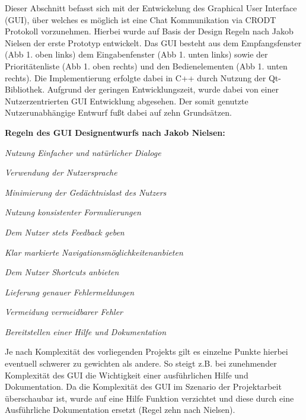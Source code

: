 \label{cap:chatGui}

Dieser Abschnitt befasst sich mit der Entwickelung des Graphical User Interface
(GUI), {\"u}ber welches es m{\"o}glich ist eine Chat Kommunikation via CRODT
Protokoll vorzunehmen. Hierbei wurde auf Basis der Design Regeln nach
Jakob Nielsen der erste Prototyp entwickelt. Das GUI besteht
aus dem Empfangsfenster (Abb 1. oben links) dem Eingabenfenster (Abb 1.
unten links) sowie der Priorit{\"a}tenliste (Abb 1. oben rechts) und den
Bedienelementen (Abb 1. unten rechts). Die Implementierung erfolgte dabei in
C++ durch Nutzung der Qt-Bibliothek. Aufgrund der geringen Entwicklungszeit,
wurde dabei von einer Nutzerzentrierten GUI Entwicklung
abgesehen. Der somit genutzte Nutzerunabh{\"a}ngige Entwurf fu{\ss}t dabei auf
zehn Grunds{\"a}tzen.

\textbf{Regeln des GUI Designentwurfs nach Jakob Nielsen:}

   \begin{compactenum}[I]
     \item \textit{Nutzung Einfacher und nat{\"u}rlicher Dialoge}
     \item \textit{Verwendung der Nutzersprache}
     \item \textit{Minimierung der Ged{\"a}chtnislast des Nutzers}
     \item \textit{Nutzung konsistenter Formulierungen}
     \item \textit{Dem Nutzer stets Feedback geben}
     \item \textit{Klar markierte Navigationsm{\"o}glichkeitenanbieten}
     \item \textit{Dem Nutzer Shortcuts anbieten}
     \item \textit{Lieferung genauer Fehlermeldungen}
     \item \textit{Vermeidung vermeidbarer Fehler}
     \item \textit{Bereitstellen einer Hilfe und Dokumentation}
   \end{compactenum}
   \label{Nielsen}
   

Je nach Komplexit{\"a}t des vorliegenden Projekts gilt es einzelne Punkte
hierbei eventuell schwerer zu gewichten als andere. So steigt z.B. bei
zunehmender Komplexit{\"a}t des GUI die Wichtigkeit einer ausf{\"u}hrlichen
Hilfe und Dokumentation. Da die Komplexit{\"a}t des GUI im Szenario der
Projektarbeit {\"u}berschaubar ist, wurde auf eine Hilfe Funktion verzichtet und
diese durch eine Ausf{\"u}hrliche Dokumentation ersetzt (Regel zehn nach
Nielsen).

